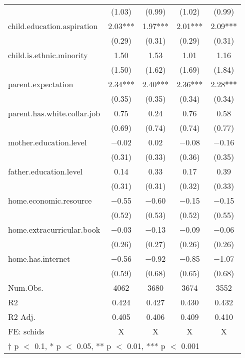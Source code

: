 \documentclass[
  man,floatsintext]{apa7}
\begin{document}
\begin{table}
\begin{tabular}[t]{lcccc}
 & (\num{1.03}) & (\num{0.99}) & (\num{1.02}) & (\num{0.99})\\
child.education.aspiration & \num{2.03}*** & \num{1.97}*** & \num{2.01}*** & \num{2.09}***\\
 & (\num{0.29}) & (\num{0.31}) & (\num{0.29}) & (\num{0.31})\\
child.is.ethnic.minority & \num{1.50} & \num{1.53} & \num{1.01} & \num{1.16}\\
 & (\num{1.50}) & (\num{1.62}) & (\num{1.69}) & (\num{1.84})\\
parent.expectation & \num{2.34}*** & \num{2.40}*** & \num{2.36}*** & \num{2.28}***\\
 & (\num{0.35}) & (\num{0.35}) & (\num{0.34}) & (\num{0.34})\\
parent.has.white.collar.job & \num{0.75} & \num{0.24} & \num{0.76} & \num{0.58}\\
 & (\num{0.69}) & (\num{0.74}) & (\num{0.74}) & (\num{0.77})\\
mother.education.level & \num{-0.02} & \num{0.02} & \num{-0.08} & \num{-0.16}\\
 & (\num{0.31}) & (\num{0.33}) & (\num{0.36}) & (\num{0.35})\\
father.education.level & \num{0.14} & \num{0.33} & \num{0.17} & \num{0.39}\\
 & (\num{0.31}) & (\num{0.31}) & (\num{0.32}) & (\num{0.33})\\
home.economic.resource & \num{-0.55} & \num{-0.60} & \num{-0.15} & \num{-0.15}\\
 & (\num{0.52}) & (\num{0.53}) & (\num{0.52}) & (\num{0.55})\\
home.extracurricular.book & \num{-0.03} & \num{-0.13} & \num{-0.09} & \num{-0.06}\\
 & (\num{0.26}) & (\num{0.27}) & (\num{0.26}) & (\num{0.26})\\
home.has.internet & \num{-0.56} & \num{-0.92} & \num{-0.85} & \num{-1.07}\\
 & (\num{0.59}) & (\num{0.68}) & (\num{0.65}) & (\num{0.68})\\
\midrule
Num.Obs. & \num{4062} & \num{3680} & \num{3674} & \num{3552}\\
R2 & \num{0.424} & \num{0.427} & \num{0.430} & \num{0.432}\\
R2 Adj. & \num{0.405} & \num{0.406} & \num{0.409} & \num{0.410}\\
FE: schids & X & X & X & X\\
\bottomrule
\multicolumn{5}{l}{\rule{0pt}{1em}† p $<$ 0.1, * p $<$ 0.05, ** p $<$ 0.01, *** p $<$ 0.001}\\
\end{tabular}
\end{table}
\end{document}
